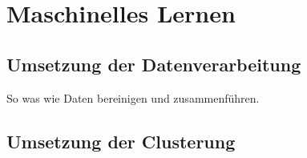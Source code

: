 \chapter{Maschinelles Lernen}
\section{Umsetzung der Datenverarbeitung}
So was wie Daten bereinigen und zusammenführen.
\section{Umsetzung der Clusterung}
